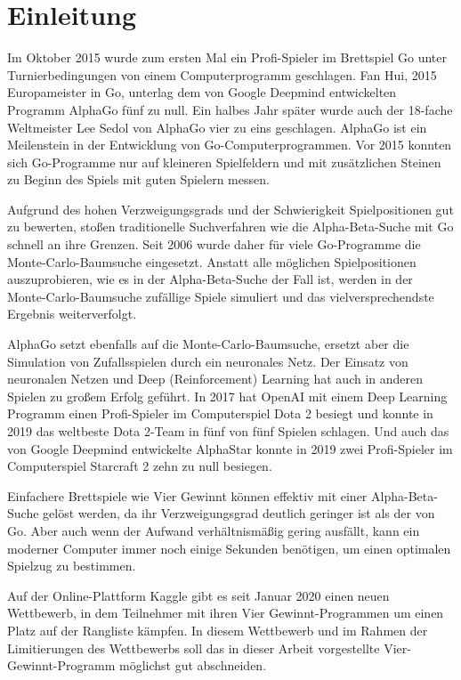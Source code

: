 \section{Einleitung}
Im Oktober 2015 wurde zum ersten Mal ein Profi-Spieler im Brettspiel Go unter Turnierbedingungen von einem Computerprogramm geschlagen. Fan Hui, 2015 Europameister in Go, unterlag dem von Google Deepmind entwickelten Programm AlphaGo fünf zu null. Ein halbes Jahr später wurde auch der 18-fache Weltmeister Lee Sedol von AlphaGo vier zu eins geschlagen.\autocite{AlphaGoStoryFar} AlphaGo ist ein Meilenstein in der Entwicklung von Go-Computerprogrammen. Vor 2015 konnten sich Go-Programme nur auf kleineren Spielfeldern und mit zusätzlichen Steinen zu Beginn des Spiels mit guten Spielern messen.

Aufgrund des hohen Verzweigungsgrads und der Schwierigkeit Spielpositionen gut zu bewerten, stoßen traditionelle Suchverfahren wie die Alpha-Beta-Suche mit Go schnell an ihre Grenzen. Seit 2006 wurde daher für viele Go-Programme die Monte-Carlo-Baumsuche eingesetzt. Anstatt alle möglichen Spielpositionen auszuprobieren, wie es in der Alpha-Beta-Suche der Fall ist, werden in der Monte-Carlo-Baumsuche zufällige Spiele simuliert und das vielversprechendste Ergebnis weiterverfolgt.

AlphaGo setzt ebenfalls auf die Monte-Carlo-Baumsuche, ersetzt aber die Simulation von Zufallsspielen durch ein neuronales Netz. Der Einsatz von neuronalen Netzen und Deep (Reinforcement) Learning hat auch in anderen Spielen zu großem Erfolg geführt. In 2017 hat OpenAI mit einem Deep Learning Programm einen Profi-Spieler im Computerspiel Dota 2 besiegt und konnte in 2019 das weltbeste Dota 2-Team in fünf von fünf Spielen schlagen.\autocite{openaiDotaLargeScale2019} Und auch das von Google Deepmind entwickelte AlphaStar konnte in 2019 zwei Profi-Spieler im Computerspiel Starcraft 2 zehn zu null besiegen.

\bigskip
Einfachere Brettspiele wie Vier Gewinnt können effektiv mit einer Alpha-Beta-Suche gelöst werden, da ihr Verzweigungsgrad deutlich geringer ist als der von Go. Aber auch wenn der Aufwand verhältnismäßig gering ausfällt, kann ein moderner Computer immer noch einige Sekunden benötigen, um einen optimalen Spielzug zu bestimmen.

Auf der Online-Plattform Kaggle gibt es seit Januar 2020 einen neuen Wettbewerb, in dem Teilnehmer mit ihren Vier Gewinnt-Programmen um einen Platz auf der Rangliste kämpfen. In diesem Wettbewerb und im Rahmen der Limitierungen des Wettbewerbs soll das in dieser Arbeit vorgestellte Vier-Gewinnt-Programm möglichst gut abschneiden.

